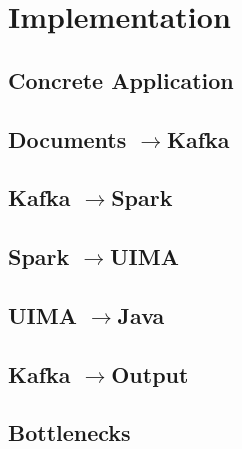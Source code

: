 \chapter{Implementation}

\section{Concrete Application}

\section{Documents \texorpdfstring{$\rightarrow{}$}{→}Kafka}

\section{Kafka \texorpdfstring{$\rightarrow{}$}{→}Spark}

\section{Spark \texorpdfstring{$\rightarrow{}$}{→}UIMA}

\section{UIMA \texorpdfstring{$\rightarrow{}$}{→}Java}

\section{Kafka \texorpdfstring{$\rightarrow{}$}{→}Output}

\section{Bottlenecks}
